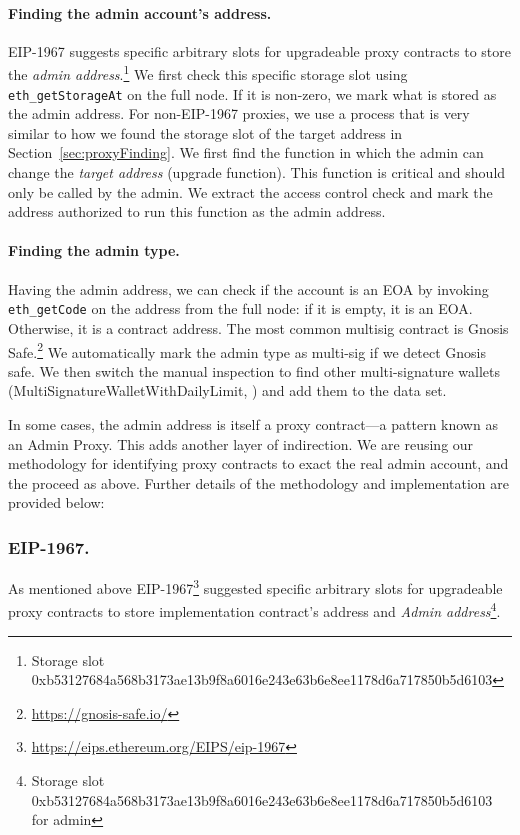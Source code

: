 \paragraph{Finding the admin account's address.} EIP-1967 suggests specific arbitrary slots for upgradeable proxy contracts to store the \textit{admin address}.\footnote{Storage slot 0xb53127684a568b3173ae13b9f8a6016e243e63b6e8ee1178d6a717850b5d6103} We first check this specific storage slot using \texttt{eth\_getStorageAt} on the full node. If it is non-zero, we mark what is stored as the admin address. 
For non-EIP-1967 proxies, we use a process that is very similar to how we found the storage slot of the target address in Section~\ref{sec:proxyFinding}. We first find the function in which the admin can change the \textit{target address} (upgrade function). This function is critical and should only be called by the admin. We extract the access control check and mark the address authorized to run this function as the admin address.

\paragraph{Finding the admin type.} Having the admin address, we can check if the account is an EOA by invoking \texttt{eth\_getCode} on the address from the full node: if it is empty, it is an EOA. Otherwise, it is a contract address. The most common multisig contract is Gnosis Safe.\footnote{\url{https://gnosis-safe.io/}} We automatically mark the admin type as multi-sig if we detect Gnosis safe. We then switch the manual inspection to find other multi-signature wallets (\eg MultiSignatureWalletWithDailyLimit, \etc) and add them to the data set. 

In some cases, the admin address is itself a proxy contract---a pattern known as an Admin Proxy. This adds another layer of indirection. We are reusing our methodology for identifying proxy contracts to exact the real admin account, and the proceed as above. Further details of the methodology and implementation are provided below:

\subsubsection{EIP-1967.}
As mentioned above EIP-1967\footnote{\url{https://eips.ethereum.org/EIPS/eip-1967}} suggested specific arbitrary slots for upgradeable proxy contracts to store implementation contract's address and \textit{Admin address}\footnote{Storage slot 0xb53127684a568b3173ae13b9f8a6016e243e63b6e8ee1178d6a717850b5d6103 for admin}.

